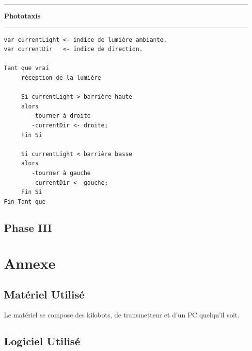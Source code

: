 \documentclass[a4paper,8pt]{report}
\begin{document}
\newpage
\begin{center}
  \rule{\linewidth}{.5pt}
  \textbf{Phototaxis}\\
  \rule{\linewidth}{.5pt}
\end{center}

\begin{verbatim}
var currentLight <- indice de lumière ambiante.
var currentDir   <- indice de direction.

Tant que vrai   
     réception de la lumière

     Si currentLight > barrière haute
     alors
        -tourner à droite
        -currentDir <- droite;
     Fin Si
 
     Si currentLight < barrière basse
     alors
        -tourner à gauche
        -currentDir <- gauche;
     Fin Si
Fin Tant que
\end{verbatim}



\section*{Phase III}\label{sec:name}

\chapter{Annexe}

\section*{Mat\'eriel Utilis\'e}\label{sec:name}

Le mat\'eriel se compose des kilobots, de transmetteur et d'un PC quelqu'il soit.

\section*{Logiciel Utilis\'e}\label{sec:name}
\end{document}
